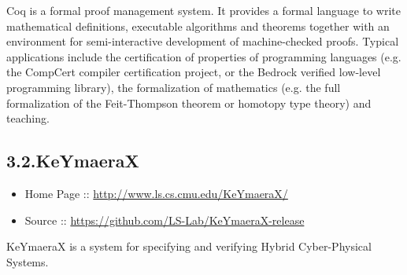\documentclass[12pt,twoside]{article}
\begin{document}
\noindent{}Coq is a formal proof management system. It provides a formal language
to write mathematical definitions, executable algorithms and theorems
together with an environment for semi-interactive development of
machine-checked proofs. Typical applications include the certification
of properties of programming languages (e.g. the CompCert compiler
certification project, or the Bedrock verified low-level programming
library), the formalization of mathematics (e.g. the full
formalization of the Feit-Thompson theorem or homotopy type theory)
and teaching.%

\subsection{3.2.\hspace*{0.5em}KeYmaeraX}\label{sec-keymaerax}%

\begin{itemize}[noitemsep,topsep=\mdcompacttopsep]%

\item{}Home Page :: \href{http://www.ls.cs.cmu.edu/KeYmaeraX/}{{\ttfamily http://\hspace{0pt}www.\hspace{0pt}ls.\hspace{0pt}cs.\hspace{0pt}cmu.\hspace{0pt}edu/\hspace{0pt}KeYmaeraX/\hspace{0pt}}}%

\item{}Source :: \href{https://github.com/LS-Lab/KeYmaeraX-release}{{\ttfamily https://\hspace{0pt}github.\hspace{0pt}com/\hspace{0pt}LS-\hspace{0pt}Lab/\hspace{0pt}KeYmaeraX-\hspace{0pt}release}}%
\end{itemize}%

\noindent{}KeYmaeraX is a system for specifying and verifying Hybrid
Cyber-Physical Systems.%

\end{document}
